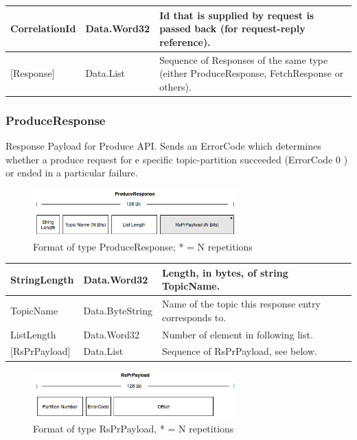 \begin{table}[H]
\centering
\begin{tabular}{ l  l  p{10cm} }
\hline
CorrelationId  & Data.Word32 & Id that is supplied by request is passed back
(for request-reply reference).              \\ \hline
{[}Response{]} & Data.List   & Sequence of Responses of the same type (either
ProduceResponse, FetchResponse or others). \\ \hline
\end{tabular}
\end{table}


\subsubsection{ProduceResponse}
Response Payload for Produce API. Sends an ErrorCode which determines whether a
produce request for e specific topic-partition succeeded (ErrorCode 0 ) or ended
in a particular failure. 

\begin{figure}[H]
    \centering
    \includegraphics[width=0.7\textwidth]{images/impl-prot-types-produceResponse.png}
    \caption{Format of type ProduceResponse; * = N repetitions}
    \label{fig:impl-prot-types-produceResponse}
\end{figure}

\begin{table}[H]
\centering
\begin{tabular}{ l  l  p{10cm} }
\hline
StringLength      & Data.Word32     & Length, in bytes, of string TopicName. \\ \hline
TopicName         & Data.ByteString & Name of the topic this response entry corresponds to.\\ \hline
ListLength        & Data.Word32     & Number of element in following list.\\ \hline
{[}RsPrPayload{]} & Data.List       & Sequence of RsPrPayload, see below.
\\ \hline
\end{tabular}
\end{table}

\begin{figure}[H]
    \centering
    \includegraphics[width=0.7\textwidth]{images/impl-prot-types-prPayload.png}
    \caption{Format of type RsPrPayload, * = N repetitions}
    \label{fig:impl-prot-types-prPayload}
\end{figure}


